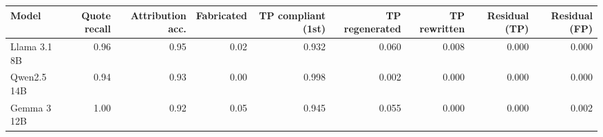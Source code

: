\begin{tabular}{lrrrrrrrr}
\toprule
Model & Quote recall & Attribution acc. & Fabricated & TP compliant (1st) & TP regenerated & TP rewritten & Residual (TP) & Residual (FP) \\
\midrule
Llama 3.1 8B & 0.96 & 0.95 & 0.02 & 0.932 & 0.060 & 0.008 & 0.000 & 0.000 \\
Qwen2.5 14B & 0.94 & 0.93 & 0.00 & 0.998 & 0.002 & 0.000 & 0.000 & 0.000 \\
Gemma 3 12B & 1.00 & 0.92 & 0.05 & 0.945 & 0.055 & 0.000 & 0.000 & 0.002 \\
\bottomrule
\end{tabular}
